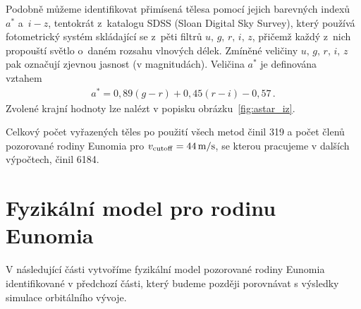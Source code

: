 \documentclass[A4paper, 12pt, oneside]{book}
\begin{document}
Podobně můžeme identifikovat přimísená tělesa pomocí jejich barevných indexů $a^*$ a~$i-z$, tentokrát z~katalogu SDSS (Sloan Digital Sky Survey), který používá fotometrický systém skládající se z~pěti filtrů $u,\,g,\,r,\,i,\,z$, přičemž každý z~nich propouští světlo o~daném rozsahu vlnových délek. Zmíněné veličiny $u,\,g,\,r,\,i,\,z$ pak označují zjevnou jasnost (v magnitudách). Veličina $a^*$ je definována vztahem~\cite{ivezic01}
\begin{align}
	a^ *= 0,89 (g - r) + 0,45 (r - i) - 0,57\,.
\end{align}
Zvolené krajní hodnoty lze nalézt v popisku obrázku~\ref{fig:astar_iz}.

Celkový počet vyřazených těles po použití všech metod činil 319 a počet členů pozorované rodiny Eunomia pro $v_{\rm cutoff}=44\,{\rm m/s}$, se kterou pracujeme v dalších výpočtech, činil 6184.

\pagebreak

\section{Fyzikální model pro rodinu Eunomia}
V následující části vytvoříme fyzikální model pozorované rodiny Eunomia identifikované v předchozí části, který budeme později porovnávat s výsledky simulace orbitálního vývoje.
\end{document}
